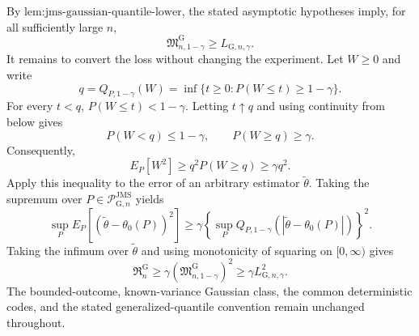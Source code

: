 By \(\text{lem:jms-gaussian-quantile-lower}\), the stated asymptotic hypotheses imply, for all sufficiently large \(n\),
\[
 \mathfrak M_{n,1-\gamma}^{\mathrm G}\ge L_{\mathrm G,n,\gamma}.
\]
It remains to convert the loss without changing the experiment.  Let \(W\ge0\) and write
\[
 q=Q_{P,1-\gamma}(W)
 =\inf\{t\ge0:P(W\le t)\ge1-\gamma\}.
\]
For every \(t<q\), \(P(W\le t)<1-\gamma\).  Letting \(t\uparrow q\) and using continuity from below gives
\[
 P(W<q)\le1-\gamma,
 \qquad
 P(W\ge q)\ge\gamma.
\]
Consequently,
\[
 E_P[W^2]\ge q^2P(W\ge q)\ge\gamma q^2.
\]
Apply this inequality to the error of an arbitrary estimator \(\widetilde\theta\).  Taking the supremum over \(P\in\mathcal P_{\mathrm G,n}^{\mathrm{JMS}}\) yields
\[
 \sup_P E_P[(\widetilde\theta-\theta_0(P))^2]
 \ge\gamma\left\{
   \sup_PQ_{P,1-\gamma}(|\widetilde\theta-\theta_0(P)|)
 \right\}^2.
\]
Taking the infimum over \(\widetilde\theta\) and using monotonicity of squaring on \([0,\infty)\) gives
\[
 \mathfrak R_n^{\mathrm G}
 \ge\gamma(\mathfrak M_{n,1-\gamma}^{\mathrm G})^2
 \ge\gamma L_{\mathrm G,n,\gamma}^2.
\]
The bounded-outcome, known-variance Gaussian class, the common deterministic codes, and the stated generalized-quantile convention remain unchanged throughout.